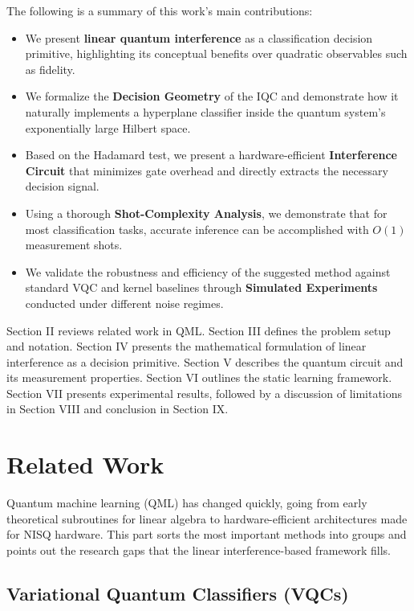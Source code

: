 \documentclass[conference]{IEEEtran}
\begin{document}
The following is a summary of this work's main contributions:
\begin{itemize}
    \item We present \textbf{linear quantum interference} as a classification decision primitive, highlighting its conceptual benefits over quadratic observables such as fidelity.
    \item We formalize the \textbf{Decision Geometry} of the IQC and demonstrate how it naturally implements a hyperplane classifier inside the quantum system's exponentially large Hilbert space.
    \item Based on the Hadamard test, we present a hardware-efficient \textbf{Interference Circuit} that minimizes gate overhead and directly extracts the necessary decision signal.
    \item Using a thorough \textbf{Shot-Complexity Analysis}, we demonstrate that for most classification tasks, accurate inference can be accomplished with $O(1)$ measurement shots.
    \item We validate the robustness and efficiency of the suggested method against standard VQC and kernel baselines through \textbf{Simulated Experiments} conducted under different noise regimes.
\end{itemize}


Section II reviews related work in QML. Section III defines the problem setup and notation. Section IV presents the mathematical formulation of linear interference as a decision primitive. Section V describes the quantum circuit and its measurement properties. Section VI outlines the static learning framework. Section VII presents experimental results, followed by a discussion of limitations in Section VIII and conclusion in Section IX.

\section{Related Work}

Quantum machine learning (QML) has changed quickly, going from early theoretical subroutines for linear algebra to hardware-efficient architectures made for NISQ hardware. This part sorts the most important methods into groups and points out the research gaps that the linear interference-based framework fills.

\subsection{Variational Quantum Classifiers (VQCs)}
\end{document}
